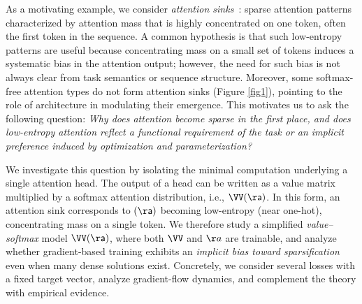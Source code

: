 \documentclass{article}
\theoremstyle{plain}
\theoremstyle{definition}
\theoremstyle{remark}
\begin{document}



As a motivating example, we consider \emph{attention sinks}~\citep{xiao2024efficient}: sparse attention patterns characterized by attention mass that is highly concentrated on one token, often the first token in the sequence. A common hypothesis is that such low-entropy patterns are useful because concentrating mass on a small set of tokens induces a systematic bias in the attention output; however, the need for such bias is not always clear from task semantics or sequence structure. Moreover, some softmax-free attention types do not form attention sinks (Figure \ref{fig1}), pointing to the role of architecture in modulating their emergence.
This motivates us to ask the following question: 
\emph{Why does attention become sparse in the first place, and does low-entropy attention reflect a functional requirement of the task or an implicit preference induced by optimization and parameterization?}


We investigate this question by isolating the minimal computation underlying a single attention head. The output of a head can be written as a value matrix multiplied by a softmax attention distribution, i.e., $\VV\sf(\aa)$. In this form, an attention sink corresponds to $\sf(\aa)$ becoming low-entropy (near one-hot), concentrating mass on a single token. We therefore study a simplified \emph{value--softmax} model $\VV\sf(\aa)$, where both $\VV$ and $\aa$ are trainable, and analyze whether gradient-based training exhibits an \emph{implicit bias toward sparsification} even when many dense solutions exist. Concretely, we consider several losses with a fixed target vector, analyze gradient-flow dynamics, and complement the theory with empirical evidence.
\end{document}
